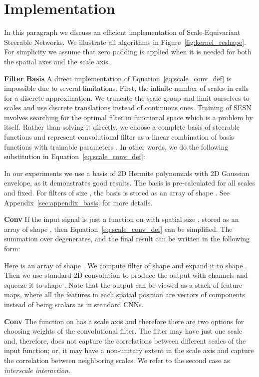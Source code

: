 \documentclass{article} \usepackage{multirow}
\def\Figref#1{Figure~\ref{#1}}
\def\Apref#1{Appendix~\ref{#1}}
\def\Eqref#1{Equation~\ref{#1}}
\begin{document}
 \section{Implementation}
In this paragraph we discuss an efficient implementation of Scale-Equivariant Steerable Networks.
We illustrate all algorithms in \Figref{fig:kernel_reshape}.
For simplicity we assume that zero padding is applied when it is needed for both the spatial axes and the scale axis. 

\label{sec:implementation}
\textbf{Filter Basis}
A direct implementation of \Eqref{eq:scale_conv_def} is impossible due to several limitations.
First, the infinite number of scales in  calls for a discrete approximation.
We truncate the scale group and limit ourselves to  scales
and use discrete translations instead of continuous ones.
Training of SESN involves searching for the optimal filter in functional space which is a problem by itself. 
Rather than solving it directly, 
we choose a complete basis of  steerable functions 
and represent convolutional filter as a linear combination of
basis functions with trainable parameters . In other words, we do the following 
substitution in \Eqref{eq:scale_conv_def}: 


In our experiments we use a basis of 2D Hermite polynomials with 2D Gaussian envelope, 
as it demonstrates good results. The basis is pre-calculated for all scales and 
fixed. For filters of size , the basis is stored as an array of shape .
See \Apref{sec:appendix_basis} for more details.

\textbf{Conv }
If the input signal is just a function on  with spatial size , stored as an array of shape 
,
then \Eqref{eq:scale_conv_def} can be simplified. The summation over  degenerates, and the final result 
can be written in the following form:


Here  is an array of shape . We compute filter 
of shape 
and expand it to shape . Then we use standard 2D convolution
to produce the output with  channels and squeeze it to shape .
Note that the output can be viewed as a stack of feature maps, where all the features in each spatial position 
are vectors of  components
instead of being scalars as in standard CNNs. 

\textbf{Conv }
The function on  has a scale axis and therefore there are two options for choosing weights of the convolutional filter. The filter may have just one scale and, therefore, does not capture the correlations between different scales 
of the input function; or, it may have a non-unitary extent  in the scale axis and capture the correlation 
between  neighboring scales. We refer to the second case as \textit{interscale interaction}. 
\end{document}
